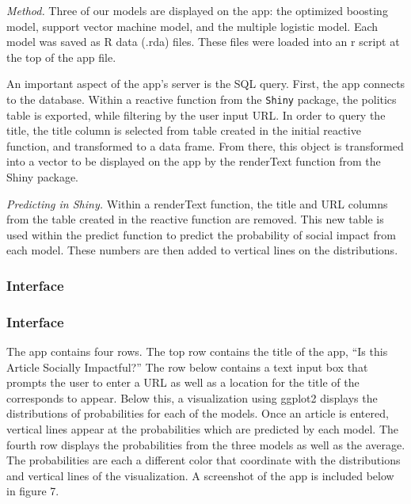 \documentclass[10pt,letterpaper]{article}
\begin{document}
\emph{Method.} Three of our models are displayed on the app: the
optimized boosting model, support vector machine model, and the multiple
logistic model. Each model was saved as R data (.rda) files. These files
were loaded into an r script at the top of the app file.

An important aspect of the app's server is the SQL query. First, the app
connects to the database. Within a reactive function from the
\texttt{Shiny} package, the politics table is exported, while filtering
by the user input URL. In order to query the title, the title column is
selected from table created in the initial reactive function, and
transformed to a data frame. From there, this object is transformed into
a vector to be displayed on the app by the renderText function from the
Shiny package.

\emph{Predicting in Shiny.} Within a renderText function, the title and
URL columns from the table created in the reactive function are removed.
This new table is used within the predict function to predict the
probability of social impact from each model. These numbers are then
added to vertical lines on the distributions.


\subsubsection{Interface}\label{interface}
\hypertarget{interface}{%
\subsubsection{Interface}\label{interface}}


The app contains four rows. The top row contains the title of the app,
``Is this Article Socially Impactful?'' The row below contains a text
input box that prompts the user to enter a URL as well as a location for
the title of the corresponds to appear. Below this, a visualization
using ggplot2 displays the distributions of probabilities for each of
the models. Once an article is entered, vertical lines appear at the
probabilities which are predicted by each model. The fourth row displays
the probabilities from the three models as well as the average. The
probabilities are each a different color that coordinate with the
distributions and vertical lines of the visualization. A screenshot of
the app is included below in figure 7.
\end{document}
